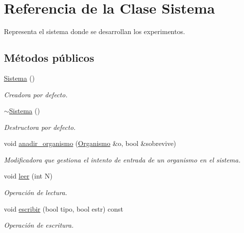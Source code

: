 \hypertarget{class_sistema}{\section{\-Referencia de la \-Clase \-Sistema}
\label{class_sistema}
}


\-Representa el sistema donde se desarrollan los experimentos.  


\subsection*{\-Métodos públicos}
\begin{DoxyCompactItemize}
\item 
\hyperlink{class_sistema_a815b07845ef6b03247b239333fe75e28}{\-Sistema} ()
\begin{DoxyCompactList}\small\item\em \-Creadora por defecto. \end{DoxyCompactList}\item 
\hyperlink{class_sistema_aafc86e0f2c3d734fb4c0985f70c27a1a}{$\sim$\-Sistema} ()
\begin{DoxyCompactList}\small\item\em \-Destructora por defecto. \end{DoxyCompactList}\item 
void \hyperlink{class_sistema_a6522b718fc0701d38c2e2d2c2d2e88a6}{anadir\-\_\-organismo} (\hyperlink{class_organismo}{\-Organismo} \&o, bool \&sobrevive)
\begin{DoxyCompactList}\small\item\em \-Modificadora que gestiona el intento de entrada de un organismo en el sistema. \end{DoxyCompactList}\item 
void \hyperlink{class_sistema_ae670549104642dd4664ac8f794b4b1e9}{leer} (int \-N)
\begin{DoxyCompactList}\small\item\em \-Operación de lectura. \end{DoxyCompactList}\item 
void \hyperlink{class_sistema_a3f2a05a17345ee3be8331950fb2eedc0}{escribir} (bool tipo, bool estr) const 
\begin{DoxyCompactList}\small\item\em \-Operación de escritura. \end{DoxyCompactList}\end{DoxyCompactItemize}

